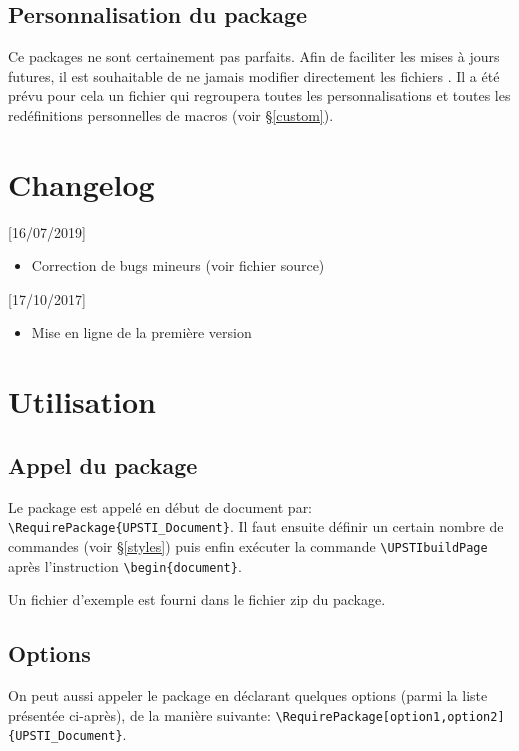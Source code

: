 \documentclass[11pt]{article}
\begin{document}
\subsection{Personnalisation du package}
Ce packages ne sont certainement pas parfaits. Afin de faciliter les mises à jours futures, il est souhaitable de ne jamais modifier directement les fichiers . Il a été prévu pour cela un fichier  qui regroupera toutes les personnalisations et toutes les redéfinitions personnelles de macros (voir \S \ref{custom}).


\section{Changelog}
[16/07/2019]
\begin{itemize}
\item Correction de bugs mineurs (voir fichier source)
\end{itemize}
[17/10/2017]
\begin{itemize}
\item Mise en ligne de la première version
\end{itemize}


\section{Utilisation}
\subsection{Appel du package}
Le package est appelé en début de document par: \verb!\RequirePackage{UPSTI_Document}!. Il faut ensuite définir un certain nombre de commandes (voir \S \ref{styles}) puis enfin exécuter la commande \linebreak \verb!\UPSTIbuildPage! après l'instruction \verb!\begin{document}!.

Un fichier d'exemple  est fourni dans le fichier zip du package.

\subsection{Options\label{optionsAppel}}
On peut aussi appeler le package en déclarant quelques options (parmi la liste présentée ci-après), de la manière suivante: \verb!\RequirePackage[option1,option2]{UPSTI_Document}!. 
\end{document}
